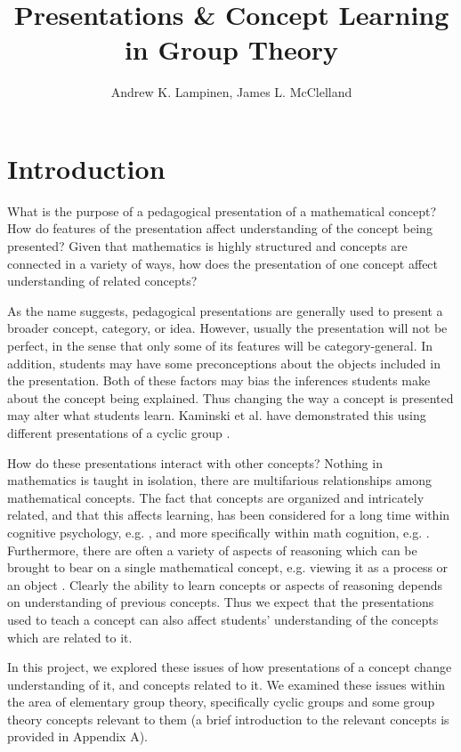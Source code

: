 \documentclass[man,10pt]{apa6}
\title{Presentations \& Concept Learning in Group Theory}
\author{Andrew K. Lampinen, James L. McClelland}
\affiliation{Department of Psychology, Stanford University}
\date{}
\begin{document}
\maketitle
\section{Introduction}
What is the purpose of a pedagogical presentation of a mathematical concept? How do features of the presentation affect understanding of the concept being presented? Given that mathematics is highly structured and concepts are connected in a variety of ways, how does the presentation of one concept affect understanding of related concepts? \par
As the name suggests, pedagogical presentations are generally used to present a broader concept, category, or idea. However, usually the presentation will not be perfect, in the sense that only some of its features will be category-general. In addition, students may have some preconceptions about the objects included in the presentation. Both of these factors may bias the inferences students make about the concept being explained. Thus changing the way a concept is presented may alter what students learn. Kaminski et al. have demonstrated this using different presentations of a cyclic group \cite{Kaminski2008}. \par
How do these presentations interact with other concepts? Nothing in mathematics is taught in isolation, there are multifarious relationships among mathematical concepts. The fact that concepts are organized and intricately related, and that this affects learning, has been considered for a long time within cognitive psychology, e.g. \cite{Fischer1980}, and more specifically within math cognition, e.g. \cite{Hazzan1999}. Furthermore, there are often a variety of aspects of reasoning which can be brought to bear on a single mathematical concept, e.g. viewing it as a process or an object \cite{Hazzan1999,Dubinsky1991}. Clearly the ability to learn concepts or aspects of reasoning depends on understanding of previous concepts. Thus we expect that the presentations used to teach a concept can also affect students' understanding of the concepts which are related to it. \par
In this project, we explored these issues of how presentations of a concept change understanding of it, and concepts related to it. We examined these issues within the area of elementary group theory, specifically cyclic groups and some group theory concepts relevant to them (a brief introduction to the relevant concepts is provided in Appendix A). 
\end{document}
